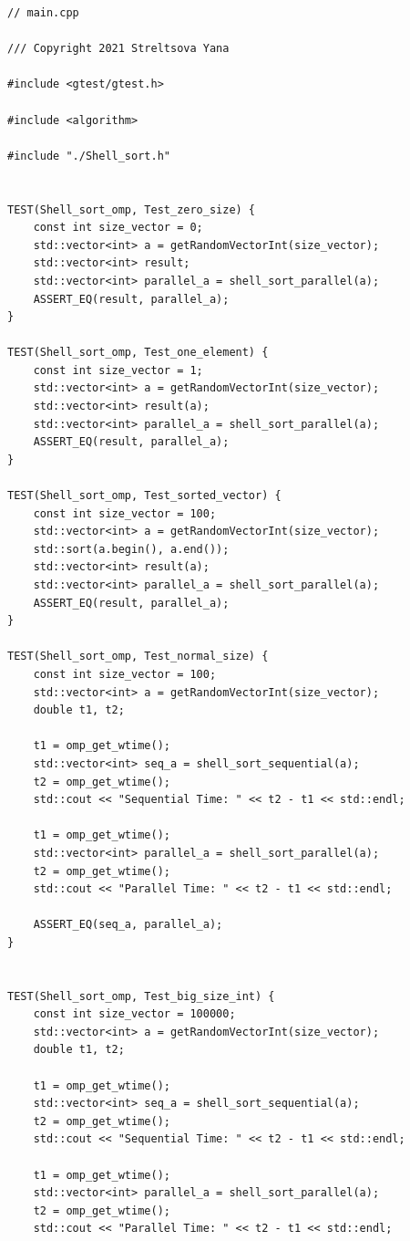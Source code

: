 \documentclass{report}
\begin{document}
\begin{lstlisting}
// main.cpp

/// Copyright 2021 Streltsova Yana

#include <gtest/gtest.h>

#include <algorithm>

#include "./Shell_sort.h"


TEST(Shell_sort_omp, Test_zero_size) {
    const int size_vector = 0;
    std::vector<int> a = getRandomVectorInt(size_vector);
    std::vector<int> result;
    std::vector<int> parallel_a = shell_sort_parallel(a);
    ASSERT_EQ(result, parallel_a);
}

TEST(Shell_sort_omp, Test_one_element) {
    const int size_vector = 1;
    std::vector<int> a = getRandomVectorInt(size_vector);
    std::vector<int> result(a);
    std::vector<int> parallel_a = shell_sort_parallel(a);
    ASSERT_EQ(result, parallel_a);
}

TEST(Shell_sort_omp, Test_sorted_vector) {
    const int size_vector = 100;
    std::vector<int> a = getRandomVectorInt(size_vector);
    std::sort(a.begin(), a.end());
    std::vector<int> result(a);
    std::vector<int> parallel_a = shell_sort_parallel(a);
    ASSERT_EQ(result, parallel_a);
}

TEST(Shell_sort_omp, Test_normal_size) {
    const int size_vector = 100;
    std::vector<int> a = getRandomVectorInt(size_vector);
    double t1, t2;

    t1 = omp_get_wtime();
    std::vector<int> seq_a = shell_sort_sequential(a);
    t2 = omp_get_wtime();
    std::cout << "Sequential Time: " << t2 - t1 << std::endl;

    t1 = omp_get_wtime();
    std::vector<int> parallel_a = shell_sort_parallel(a);
    t2 = omp_get_wtime();
    std::cout << "Parallel Time: " << t2 - t1 << std::endl;

    ASSERT_EQ(seq_a, parallel_a);
}


TEST(Shell_sort_omp, Test_big_size_int) {
    const int size_vector = 100000;
    std::vector<int> a = getRandomVectorInt(size_vector);
    double t1, t2;

    t1 = omp_get_wtime();
    std::vector<int> seq_a = shell_sort_sequential(a);
    t2 = omp_get_wtime();
    std::cout << "Sequential Time: " << t2 - t1 << std::endl;

    t1 = omp_get_wtime();
    std::vector<int> parallel_a = shell_sort_parallel(a);
    t2 = omp_get_wtime();
    std::cout << "Parallel Time: " << t2 - t1 << std::endl;


\end{lstlisting}
\end{document}
